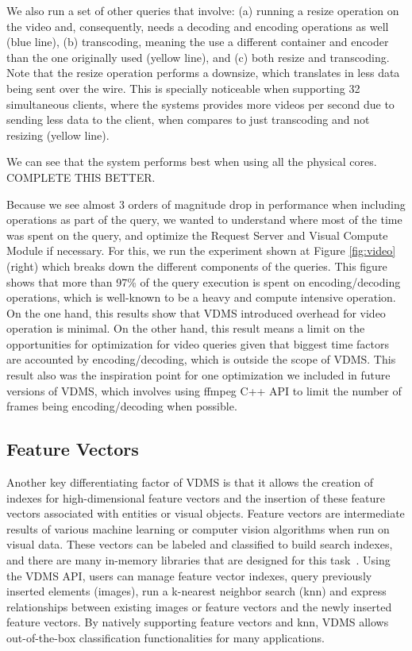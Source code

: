 We also run a set of other queries that involve: (a) running a resize operation
on the video and, consequently, needs a decoding and
encoding operations as well (blue line),
(b) transcoding, meaning the use a different container and encoder
than the one originally used (yellow line), and (c) both resize and transcoding.
Note that the resize operation performs a downsize, which translates in less
data being sent over the wire. This is specially noticeable when supporting 32
simultaneous clients, where the systems provides more videos per second due to
sending less data to the client, when compares to just transcoding and not resizing (yellow line).

We can see that the system performs best when using all the physical cores.
COMPLETE THIS BETTER.

Because we see almost 3 orders of magnitude drop in performance when including
operations as part of the query, we wanted to understand where most of the time
was spent on the query, and optimize the Request Server and Visual Compute Module
if necessary. For this, we run the experiment shown at
Figure \ref{fig:video} (right) which breaks down the different components of the
queries. This figure shows that more than 97\% of the query execution is spent
on encoding/decoding operations, which is well-known to be a
heavy and compute intensive operation.
On the one hand, this results show that VDMS introduced overhead for
video operation is minimal. On the other hand, this result means a
limit on the opportunities for optimization for video queries given
that biggest time factors are accounted by encoding/decoding, which is
outside the scope of VDMS.
This result also was the inspiration point for one optimization we included
in future versions of VDMS, which involves using ffmpeg C++ API to
limit the number of frames being encoding/decoding when possible.


\subsection{Feature Vectors}

Another key differentiating factor of VDMS is that it allows the creation of
indexes for high-dimensional feature vectors and the insertion of
these feature vectors associated with entities or visual objects.
Feature vectors are intermediate results of various machine
learning or computer vision algorithms when run on visual data.
These vectors can be labeled and classified to build search indexes,
and there are many in-memory libraries that are designed for
this task~\cite{flann, faiss}.
Using the VDMS API, users can manage feature vector indexes,
query previously inserted elements (images),
run a k-nearest neighbor search (knn) and express relationships
between existing images or feature vectors and
the newly inserted feature vectors.
By natively supporting feature vectors and knn,
VDMS allows out-of-the-box classification
functionalities for many applications.


